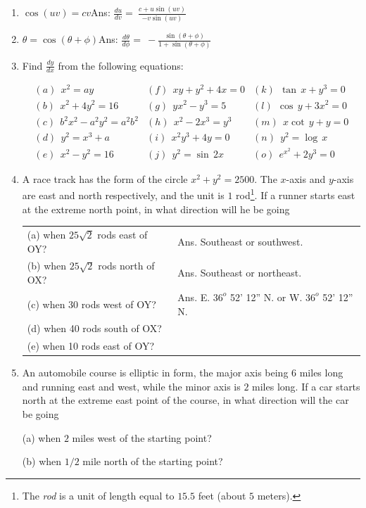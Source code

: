\begin{enumerate}
\item
$\cos(uv) = cv$\qquad\qquad\qquad\qquad\qquad\qquad Ans:  	
$\frac{du}{dv} 	=\ \frac{c + u\sin(uv)}{-v\sin(uv)}$

\item
$\theta = \cos(\theta + \phi)$\qquad\qquad\qquad\qquad\qquad\qquad Ans: 
$\frac{d\theta}{d\phi} 	=\ -\frac{\sin(\theta + \phi)}{1 + \sin(\theta + \phi)}$

\item
Find $\frac{dy}{dx}$ from the following equations:

\[
\begin{array}{lll}
(a)\ \  x^2 = ay & 	(f)\ \  xy + y^2 + 4x = 0 &	(k)\ \  \tan\, x + y^3 = 0\\
(b)\ \  x^2 + 4y^2 = 16  & 	(g)\ \  yx^2 - y^3 = 5 & 	(l)\ \  \cos\, y + 3x^2 = 0\\
(c)\ \  b^2x^2 - a^2y^2 = a^2b^2  & (h)\ \  x^2 - 2x^3 = y^3 & 	(m)\ \  x\cot\, y + y = 0\\
(d)\ \  y^2 = x^3 + a  & 	(i)\ \  x^2y^3 + 4y = 0  & 	(n)\ \  y^2 = \log\, x\\
(e)\ \  x^2 - y^2 = 16  &  (j)\ \  y^2 = \sin\, 2x  & 	(o)\ \  e^{x^2} + 2y^3 = 0
\end{array}
\]

\item
A race track has the form of the circle $x^2 + y^2 = 2500$. The 
$x$-axis and $y$-axis are east and north respectively, 
and the unit is $1$ rod\footnote{
The {\it rod} is a unit of length equal to $15.5$ feet (about $5$ meters).
}. 
If a runner starts east at the extreme north point, in what direction will he be going

\begin{tabular}{ll}
(a) when $25\sqrt{2}$ rods east of OY? &{\small{	Ans. 	Southeast or southwest.}}\\
(b) when $25\sqrt{2}$ rods north of OX? &{\small{	  Ans. 	Southeast or northeast.}}\\
(c) when 30 rods west of OY? 	&  {\small{Ans. 	E. $36^o$ 52' 12'' N. or W. $36^o$ 52' 12'' N.}}\\
(d) when 40 rods south of OX? & \\
(e) when 10 rods east of OY? & \\
\end{tabular}

\item
An automobile course is elliptic in form, the major axis being $6$ miles long 
and running east and west, while the minor axis is $2$ miles long. If a 
car starts north at the extreme east point of the course, in what direction will the car be going

(a) when $2$ miles west of the starting point?

(b) when $1/2$ mile north of the starting point?
\end{enumerate}

